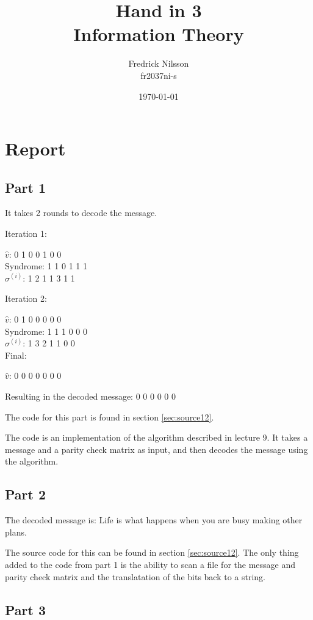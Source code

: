 \documentclass[a4paper]{article}
\title{Hand in 3 \\ Information Theory}
\author{Fredrick Nilsson \\ fr2037ni-s}
\date{\today}
\begin{document}
\maketitle

\newpage

\section{Report}
\subsection{Part 1}

It takes 2 rounds to decode the message.

Iteration 1: 

\(\hat{v}\): 0 1 0 0 1 0 0 \\
Syndrome: 1 1 0 1 1 1 \\
\(\sigma^{(i)}\): 1 2 1 1 3 1 1 


Iteration 2: 

\(\hat{v}\): 0 1 0 0 0 0 0 \\
Syndrome: 1 1 1 0 0 0 \\
\(\sigma^{(i)}\): 1 3 2 1 1 0 0  \\

Final: 

\(\hat{v}\): 0 0 0 0 0 0 0

Resulting in the decoded message: 0 0 0 0 0 0

The code for this part is found in section \ref{sec:source12}.

The code is an implementation of the algorithm described in lecture 9. It takes a message and a parity check matrix as input, and then decodes the message using the algorithm.

\subsection{Part 2}

The decoded message is:
Life is what happens when you are busy making other plans.

The source code for this can be found in section \ref{sec:source12}.
The only thing added to the code from part 1 is the ability to scan a file for the message and parity check matrix and the translatation of the bits back to a string.

\subsection{Part 3}
\end{document}
